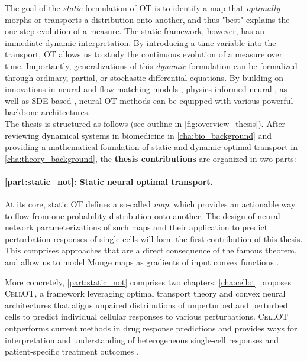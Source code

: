 The goal of the \emph{static} formulation of OT is to identify a map that \emph{optimally} morphs or transports a distribution onto another, and thus "best" explains the one-step evolution of a measure.
The static framework, however, has an immediate dynamic interpretation. By introducing a time variable into the transport, OT allows us to study the continuous evolution of a measure over time. %
Importantly, generalizations of this \emph{dynamic} formulation can be formalized through ordinary, partial, or stochastic differential equations. By building on innovations in neural  \citep{chen2018neural} and flow matching models \citep{lipman2023flow, pooladian2023multisample, liu2022flow}, physics-informed neural  \citep{brandstetter2022message, raissi2019physics}, as well as \acrfull{SDE}-based , neural OT methods can be equipped with various powerful backbone architectures. \\

The thesis is structured as follows (see outline in \cref{fig:overview_thesis}).
After reviewing dynamical systems in biomedicine in \cref{cha:bio_background} and providing a mathematical foundation of static and dynamic optimal transport in \cref{cha:theory_background}, the \textbf{thesis contributions} are organized in two parts:

\paragraph{\cref{part:static_not}: Static neural optimal transport.}

At its core, static OT defines a so-called \citeauthor{monge1781histoire} \textit{map}, which provides an actionable way to flow from one probability distribution onto another.
The design of neural network parameterizations of such maps and their application to predict perturbation responses of single cells will form the first contribution of this thesis.
This comprises approaches that are a direct consequence of the famous \citeauthor{brenier1987decomposition} theorem, and allow us to model Monge maps as gradients of input convex functions \citep{bunne2021learning, bunne2022supervised}.

More concretely, \cref{part:static_not} comprises two chapters:
\cref{cha:cellot} proposes \textsc{CellOT}, a framework leveraging optimal transport theory and convex neural architectures that aligns unpaired distributions of unperturbed and perturbed cells to predict individual cellular responses to various perturbations. 
\textsc{CellOT} outperforms current methods in drug response predictions and provides ways for interpretation and understanding of heterogeneous single-cell responses and patient-specific treatment outcomes \citep{bunne2021learning}. 

